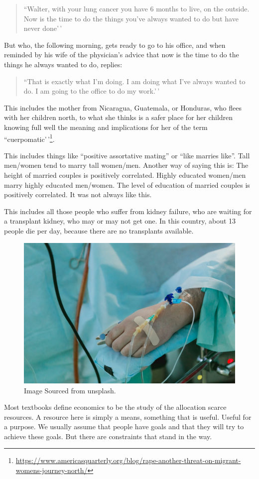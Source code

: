 \documentclass[
]{book}
\begin{document}
\begin{quote}
``Walter, with your lung cancer you have 6 months to live, on the outside. Now is the time to do the things you've always wanted to do but have never done'\,'
\end{quote}

But who, the following morning, gets ready to go to his office, and when reminded by his wife of the physician's advice that now is the time to do the things he always wanted to do, replies:

\begin{quote}
``That is exactly what I'm doing. I am doing what I've always wanted to do. I am going to the office to do my work.'\,'
\end{quote}

This includes the mother from Nicaragua, Guatemala, or Honduras, who flees with her children north, to what she thinks is a safer place for her children knowing full well the meaning and implications for her of the term ``cuerpomatic'\,'\footnote{\url{https://www.americasquarterly.org/blog/rape-another-threat-on-migrant-womens-journey-north/}}.

This includes things like ``positive assortative mating'' or ``like marries like''. Tall men/women tend to marry tall women/men. Another way of saying this is: The height of married couples is positively correlated. Highly educated women/men marry highly educated men/women. The level of education of married couples is positively correlated. It was not always like this.

This includes all those people who suffer from kidney failure, who are waiting for a transplant kidney, who may or may not get one. In this country, about 13 people die per day, because there are no transplants available.

\begin{figure}
\includegraphics[width=0.5\linewidth]{img/ch0/fig6} \caption{Image Sourced from unsplash.}\label{fig:fig006}
\end{figure}

Most textbooks define economics to be the study of the allocation scarce resources. A resource here is simply a means, something that is useful. Useful for a purpose. We usually assume that people have goals and that they will try to achieve these goals. But there are constraints that stand in the way.
\end{document}
